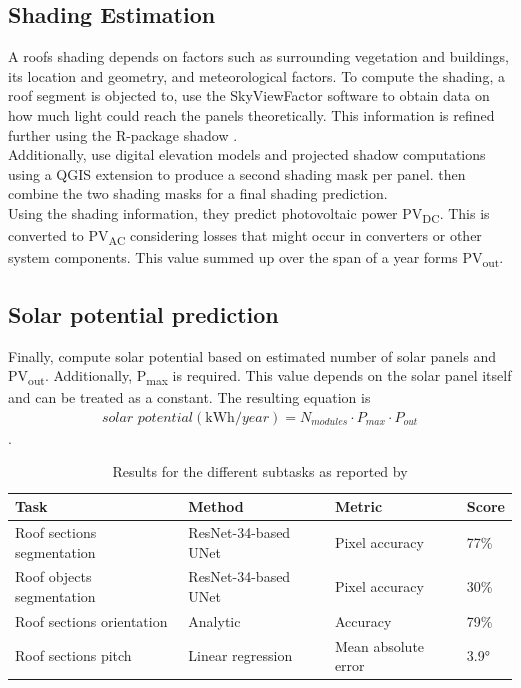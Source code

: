 \documentclass{article} %
\begin{document}
\subsection*{Shading Estimation}
A roofs shading depends on factors such as surrounding vegetation and buildings, its location and geometry, and meteorological factors. To compute the shading, a roof segment is objected to, \citet{de2021predicting} use the SkyViewFactor software \cite{zakvsek2011sky} to obtain data on how much light could reach the panels theoretically. This information is refined further using the R-package shadow \cite{dorman2019shadow}.\\
Additionally, \citet{de2021predicting} use digital elevation models and projected shadow computations using a QGIS extension \cite{qgis,qgisshadows} to produce a second shading mask per panel. \citet{de2021predicting} then combine the two shading masks for a final shading prediction.\\
Using the shading information, they predict photovoltaic power \si{PV_{\si{DC}}}. This is converted to \si{PV_{\si{AC}}} considering losses that might occur in converters or other system components. This value summed up over the span of a year forms \si{PV_{out}}.



\subsection*{Solar potential prediction}
Finally, \citet{de2021predicting} compute solar potential based on estimated number of solar panels and \si{PV_{out}}. Additionally, \si{P_{max}} is required. This value 	depends on the solar panel itself and can be treated as a constant. The resulting equation is
\begin{align*}
	\textit{solar potential} (\si{\kilo\watt \hour \per year}) = N_{\textit{modules}} \cdot \si{P_{max}} \cdot \si{P_{out}}
\end{align*}.


\begin{table}
	\caption{Results for the different subtasks as reported by \cite{de2021predicting}}
	\label{tab:results}
\begin{tabular}{l|l|l|l}
	Task                       & Method               & Metric              & Score \\ \hline
	Roof sections segmentation & ResNet-34-based UNet & Pixel accuracy      & 77\%  \\ \hline
	Roof objects segmentation  & ResNet-34-based UNet & Pixel accuracy      & 30\%  \\ \hline
	Roof sections orientation  & Analytic             & Accuracy            & 79\%  \\ \hline
	Roof sections pitch        & Linear regression    & Mean absolute error & 3.9°  \\
\end{tabular}
\end{table}
\end{document}
